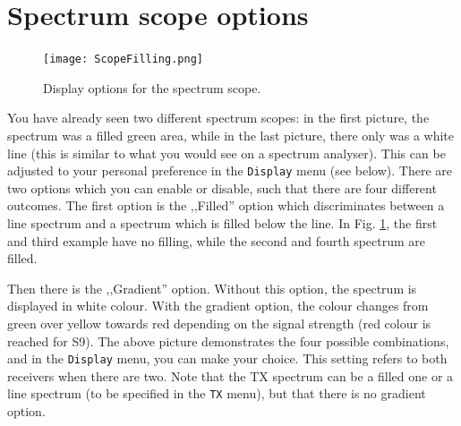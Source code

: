 \documentclass[12pt]{book}
\def\bltt#1{\texttt{\color{blue}#1}}
\begin{document}
\section{Spectrum scope options}
\label{sec:FillingGradient}

\begin{figure}[ht]
\center
\texttt{[image: ScopeFilling.png]}
\caption{Display options for the spectrum scope.}
\label{fig:scopeoptions}
\end{figure}

You have already seen two different spectrum scopes: in the first
picture, the  spectrum was a filled green area, while in the last
picture, there only was a white line (this is similar to what you
would see on a spectrum analyser). This can be adjusted to your
personal preference in the \bltt{Display} menu (see below). There
are two options which you can enable or disable, such that there
are four different outcomes. The first option is the ,,Filled'' option
which discriminates between a line spectrum and a spectrum which is
filled below the line. In Fig. \ref{fig:scopeoptions}, the first and third
example have no filling, while the second and fourth spectrum
are filled.

Then there is the ,,Gradient'' option. Without this option, the
spectrum is displayed in white colour. With the gradient option,
the colour changes from green over yellow towards red depending
on the signal strength (red colour is reached for S9). The above
picture demonstrates the four possible combinations, and in
the \bltt{Display} menu, you can make your choice. This setting
refers to both receivers when there are two. Note that the TX
spectrum can be a filled one or a line spectrum (to be specified
in the \bltt{TX} menu), but that there
is no gradient option.

\end{document}
